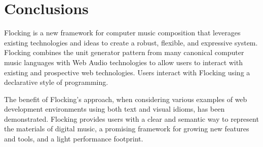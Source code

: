 \documentclass{article}
\begin{document}
\section{Conclusions}

Flocking is a new framework for computer music composition that leverages existing technologies and ideas to create a robust, flexible, and expressive system. Flocking combines the unit generator pattern from many canonical computer music languages with Web Audio technologies to allow users to interact with existing and prospective web technologies. Users interact with Flocking using a declarative style of programming.

The benefit of Flocking's approach, when considering various examples of web development environments using both text and visual idioms, has been demonstrated. Flocking provides users with a clear and semantic way to represent the materials of digital music, a promising framework for growing new features and tools, and a light performance footprint.



\end{document}
